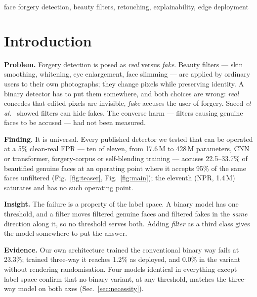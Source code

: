 \documentclass[conference]{IEEEtran}
\begin{document}
\begin{IEEEkeywords}
face forgery detection, beauty filters, retouching, explainability, edge deployment
\end{IEEEkeywords}

\section{Introduction}
\textbf{Problem.} Forgery detection is posed as \emph{real} versus \emph{fake}. Beauty
filters --- skin smoothing, whitening, eye enlargement, face slimming --- are applied by
ordinary users to their own photographs; they change pixels while preserving identity. A
binary detector has to put them somewhere, and both choices are wrong: \emph{real} concedes
that edited pixels are invisible, \emph{fake} accuses the user of forgery. Saeed
\emph{et al.}~\cite{saeed2025} showed filters can hide fakes. The converse harm --- filters
causing genuine faces to be accused --- had not been measured.

\textbf{Finding.} It is universal. Every published detector we tested that can be operated at
a 5\% clean-real FPR --- ten of eleven, from 17.6\,M to 428\,M parameters, CNN or transformer,
forgery-corpus or self-blending training --- accuses 22.5--33.7\% of beautified genuine faces
at an operating point where it accepts 95\% of the same faces unfiltered
(Fig.~\ref{fig:teaser}, Fig.~\ref{fig:main}); the eleventh (NPR, 1.4\,M) saturates and has no
such operating point.

\textbf{Insight.} The failure is a property of the label space. A binary model has one
threshold, and a filter moves filtered genuine faces and filtered fakes in the \emph{same}
direction along it, so no threshold serves both. Adding \emph{filter} as a third class gives
the model somewhere to put the answer.

\textbf{Evidence.} Our own architecture trained the conventional binary way fails at 23.3\%;
trained three-way it reaches 1.2\% as deployed, and 0.0\% in the variant without rendering
randomisation. Four models identical in everything except label space
confirm that no binary variant, at any threshold, matches the three-way model on both axes
(Sec.~\ref{sec:necessity}).
\end{document}
